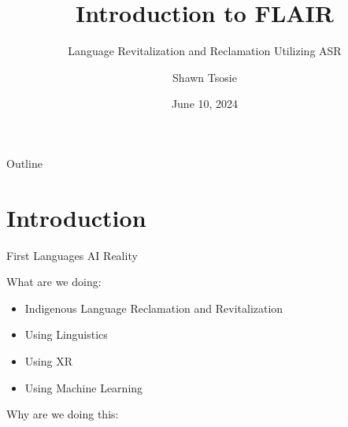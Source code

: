 \documentclass{beamer}
\title[Intro to FLAIR] %
{Introduction to FLAIR}
\subtitle{Language Revitalization and Reclamation Utilizing ASR} %
\author %
{Shawn Tsosie}
\institute[FLAIR] %
{
  Applied Machine Learning,
  First Languages AI Reality}
\date %
{June 10, 2024}
\begin{document}
\begin{frame}
  \titlepage
\end{frame}

\begin{frame}{Outline}
  \tableofcontents[pausesections]
\end{frame}




\section{Introduction}

\begin{frame}{First Languages AI Reality}
    \item What are we doing:
    \begin{itemize}
      \item Indigenous Language Reclamation and Revitalization
      \item Using Linguistics
      \item Using XR
      \item Using Machine Learning
    \end{itemize}
    \item Why are we doing this:
    \begin{itemize}
      \item
    \end{itmeize}
  \end{itemize}
\end{frame}
\end{document}

